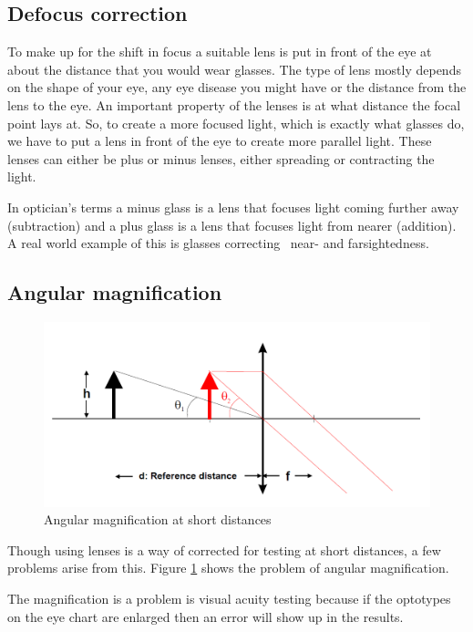 \documentclass[12pt,a4paper,notitlepage]{report}
\begin{document}
\subsection{Defocus correction}
To make up for the shift in focus a suitable lens is put in front of the eye at about the distance that you would wear glasses. The type of lens mostly depends on the shape of your eye, any eye disease you might have or the distance from the lens to the eye. An important property of the lenses is at what distance the focal point lays at. So, to create a more focused light, which is exactly what glasses do, we have to put a lens in front of the eye to create more parallel light. These lenses can either be plus or minus lenses, either spreading or contracting the light.

In optician's terms a minus glass is a lens that focuses light coming further away (subtraction) and a plus glass is a lens that focuses light from nearer (addition). A real world example of this is glasses correcting ~near- and farsightedness.

\subsection{Angular magnification}
\begin{figure}[h]
\centering
\includegraphics[width=120mm]{images/Angular_magnification.png}
\caption{Angular magnification at short distances\label{angular}}
\end{figure}

Though using lenses is a way of corrected for testing at short distances, a few problems arise from this. Figure \ref{angular} shows the problem of angular magnification. 

The magnification is a problem is visual acuity testing because if the optotypes on the eye chart are enlarged then an error will show up in the results.
\end{document}
